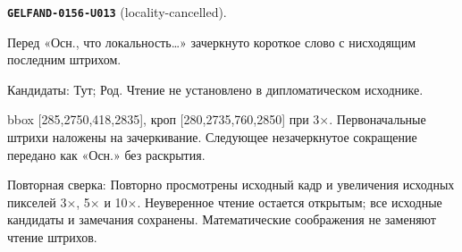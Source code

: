 \par\noindent\leavevmode{}\label{GELFAND-0156-U013}\label{GELFAND-P001439:locality-cancelled}\textbf{\texttt{GELFAND-0156-U013}} (locality-cancelled).\nopagebreak[4]\par
Перед «Осн., что локальность…» зачеркнуто короткое слово с нисходящим последним штрихом.\par
Кандидаты: Тут; Род. Чтение не установлено в дипломатическом исходнике.\par
bbox [285,2750,418,2835], кроп [280,2735,760,2850] при 3×. Первоначальные штрихи наложены на зачеркивание. Следующее незачеркнутое сокращение передано как «Осн.» без раскрытия.\par
Повторная сверка: Повторно просмотрены исходный кадр и увеличения исходных пикселей 3×, 5× и 10×. Неуверенное чтение остается открытым; все исходные кандидаты и замечания сохранены. Математические соображения не заменяют чтение штрихов.\par\medskip
